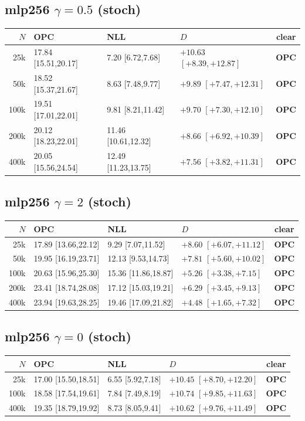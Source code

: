 \documentclass[10pt]{article}
\begin{document}
\subsection*{mlp256 $\gamma{=}0.5$ (stoch)}
{\scriptsize
\begin{tabular}{@{}r lll c@{}}
\toprule
$N$ & OPC & NLL & $D$ & clear \\
\midrule
25k & 17.84 [15.51,20.17] & 7.20 [6.72,7.68] & $+10.63$ $[+8.39,+12.87]$ & \textbf{OPC} \\
50k & 18.52 [15.37,21.67] & 8.63 [7.48,9.77] & $+9.89$ $[+7.47,+12.31]$ & \textbf{OPC} \\
100k & 19.51 [17.01,22.01] & 9.81 [8.21,11.42] & $+9.70$ $[+7.30,+12.10]$ & \textbf{OPC} \\
200k & 20.12 [18.23,22.01] & 11.46 [10.61,12.32] & $+8.66$ $[+6.92,+10.39]$ & \textbf{OPC} \\
400k & 20.05 [15.56,24.54] & 12.49 [11.23,13.75] & $+7.56$ $[+3.82,+11.31]$ & \textbf{OPC} \\
\bottomrule
\end{tabular}}

\subsection*{mlp256 $\gamma{=}2$ (stoch)}
{\scriptsize
\begin{tabular}{@{}r lll c@{}}
\toprule
$N$ & OPC & NLL & $D$ & clear \\
\midrule
25k & 17.89 [13.66,22.12] & 9.29 [7.07,11.52] & $+8.60$ $[+6.07,+11.12]$ & \textbf{OPC} \\
50k & 19.95 [16.19,23.71] & 12.13 [9.53,14.73] & $+7.81$ $[+5.60,+10.02]$ & \textbf{OPC} \\
100k & 20.63 [15.96,25.30] & 15.36 [11.86,18.87] & $+5.26$ $[+3.38,+7.15]$ & \textbf{OPC} \\
200k & 23.41 [18.74,28.08] & 17.12 [15.03,19.21] & $+6.29$ $[+3.45,+9.13]$ & \textbf{OPC} \\
400k & 23.94 [19.63,28.25] & 19.46 [17.09,21.82] & $+4.48$ $[+1.65,+7.32]$ & \textbf{OPC} \\
\bottomrule
\end{tabular}}

\subsection*{mlp256 $\gamma{=}0$ (stoch)}
{\scriptsize
\begin{tabular}{@{}r lll c@{}}
\toprule
$N$ & OPC & NLL & $D$ & clear \\
\midrule
25k & 17.00 [15.50,18.51] & 6.55 [5.92,7.18] & $+10.45$ $[+8.70,+12.20]$ & \textbf{OPC} \\
100k & 18.58 [17.54,19.61] & 7.84 [7.49,8.19] & $+10.74$ $[+9.85,+11.63]$ & \textbf{OPC} \\
400k & 19.35 [18.79,19.92] & 8.73 [8.05,9.41] & $+10.62$ $[+9.76,+11.49]$ & \textbf{OPC} \\
\bottomrule
\end{tabular}}
\end{document}
